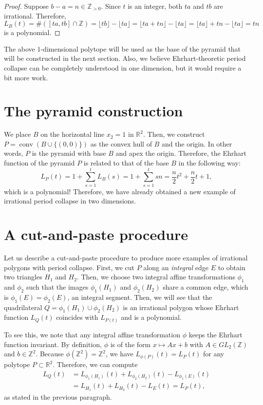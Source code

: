 \documentclass[a4paper]{article}
\DeclareMathOperator{\conv}{conv}
\begin{document}
\begin{proof}
	Suppose $b - a = n \in \mathbb{Z}_{>0}$. Since $t$ is an integer, both $ta$ and $tb$ are irrational. Therefore, $L_B(t) = \#([ta,tb] \cap \mathbb{Z}) = \lfloor tb \rfloor - \lfloor ta \rfloor = \lfloor ta + tn \rfloor - \lfloor ta \rfloor = \lfloor ta \rfloor + tn - \lfloor ta \rfloor = tn$ is a polynomial.
\end{proof}

The above $1$-dimensional polytope will be used as the base of the pyramid that will be constructed in the next section. Also, we believe Ehrhart-theoretic period collapse can be completely understood in one dimension, but it would require a bit more work.

\section{The pyramid construction}
We place $B$ on the horizontal line $x_2 = 1$ in $\mathbb{R}^2$. Then, we construct $P = \conv(B \cup \{(0,0)\})$ as the convex hull of $B$ and the origin. In other words, $P$ is the pyramid with base $B$ and apex the origin. Therefore, the Ehrhart function of the pyramid $P$ is related to that of the base $B$ in the following way:
\begin{equation}
	L_{P} (t) = 1 + \sum_{s=1}^t L_{B} (s) = 1 + \sum_{s=1}^t s n = \frac{n}{2} t^2 + \frac{n}{2} t + 1,
\end{equation} 
which is a polynomial! Therefore, we have already obtained a new example of irrational period collapse in two dimensions.

\section{A cut-and-paste procedure}
Let us describe a cut-and-paste procedure to produce more examples of irrational polygons with period collapse. First, we cut $P$ along an \textit{integral} edge $E$ to obtain two triangles $H_1$ and $H_2$. Then, we choose two integral affine transformations $\phi_1$ and $\phi_2$ such that the images $\phi_1 (H_1)$ and $\phi_2 (H_2)$ share a common edge, which is $\phi_1(E) = \phi_2(E)$, an integral segment. Then, we will see that the quadrilateral $Q = \phi_1 (H_1) \cup \phi_2 (H_2)$ is an irrational polygon whose Ehrhart function $L_Q (t)$ coincides with $L_{P(t)}$ and is a polynomial. 

To see this, we note that any integral affine transformation $\phi$ keeps the Ehrhart function invariant. By definition, $\phi$ is of the form $x \mapsto Ax + b$ with $A \in GL_2(\mathbb{Z})$ and $b \in \mathbb{Z}^2$. Because $\phi(\mathbb{Z}^2) = \mathbb{Z}^2$, we have $L_{\phi(P)} (t) = L_P (t)$ for any polytope $P \subset \mathbb{R}^2$. Therefore, we can compute
\begin{align}
	L_Q (t) &= L_{\phi_1(H_1)} (t) + L_{\phi_2(H_2)} (t) - L_{\phi_1(E)} (t) \nonumber \\
    	&= L_{H_1} (t) + L_{H_2} (t) - L_{E} (t) = L_{P} (t), 
\end{align} 
as stated in the previous paragraph.
\end{document}
